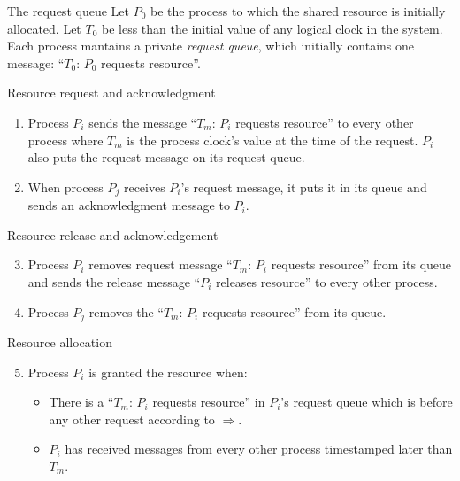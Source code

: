 \documentclass[12pt]{beamer}
\begin{document}
    \begin{frame}{The request queue}
        Let \(P_0\) be the process to which the shared resource is initially allocated.
        Let \(T_0\) be less than the initial value of any logical clock in the system.
        Each process mantains a private \emph{request queue}, which initially contains
        one message: ``\(T_0\): \(P_0\) requests resource''.
    \end{frame}

    \begin{frame}{Resource request and acknowledgment}
        \begin{enumerate}
            \item Process \(P_i\) sends the message ``\(T_m\): \(P_i\) requests
            resource'' to every other process where \(T_m\) is the process clock's value
            at the time of the request. \(P_i\) also puts the request message on its
            request queue.
            \item When process \(P_j\) receives \(P_i\)'s request message, it puts it
            in its queue and sends an acknowledgment message to \(P_i\).
        \end{enumerate}
    \end{frame}

    \begin{frame}{Resource release and acknowledgement}
        \begin{enumerate}
            \setcounter{enumi}{2}
            \item Process \(P_i\) removes request message ``\(T_m\): \(P_i\) requests
            resource'' from its queue and sends the release message ``\(P_i\) releases
            resource'' to every other process.
            \item Process \(P_j\) removes the ``\(T_m\): \(P_i\) requests resource''
            from its queue.
        \end{enumerate}
    \end{frame}

    \begin{frame}{Resource allocation}
        \begin{enumerate}
            \setcounter{enumi}{4}
            \item Process \(P_i\) is granted the resource when:
            \begin{itemize}
                \item There is a ``\(T_m\): \(P_i\) requests resource'' in \(P_i\)'s request
                queue which is before any other request according to \(\Rightarrow\).
                \item \(P_i\) has received messages from every other process timestamped
                later than \(T_m\).
            \end{itemize}
        \end{enumerate}
    \end{frame}
\end{document}
